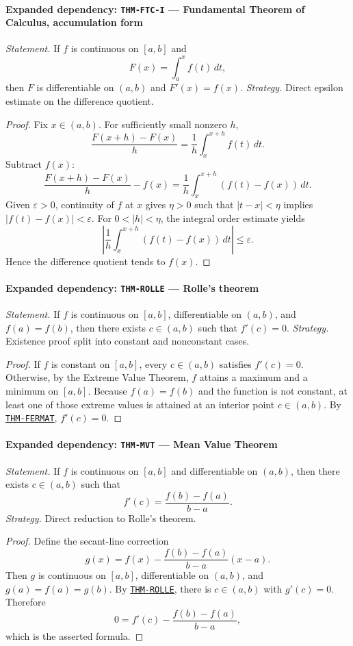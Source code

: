 \documentclass[10pt]{article}
\newcommand{\pidraw}[1]{\begingroup\urlstyle{tt}\nolinkurl{#1}\endgroup}
\newcommand{\pidref}[1]{\hyperref[prf:#1]{\pidraw{#1}}}
\newcommand{\pid}[1]{\pidref{#1}}
\theoremstyle{definition}
\theoremstyle{remark}
\begin{document}
\paragraph{Expanded dependency: \pidraw{THM-FTC-I} --- Fundamental Theorem of Calculus, accumulation form}
\textit{Statement.} If $f$ is continuous on $[a,b]$ and
\[
F(x)=\int_a^x f(t)\,dt,
\]
then $F$ is differentiable on $(a,b)$ and $F'(x)=f(x)$.
\textit{Strategy.} Direct epsilon estimate on the difference quotient.
\begin{proof}Fix $x\in(a,b)$. For sufficiently small nonzero $h$,
\[
\frac{F(x+h)-F(x)}{h}
=
\frac1h\int_x^{x+h}f(t)\,dt.
\]
Subtract $f(x)$:
\[
\frac{F(x+h)-F(x)}{h}-f(x)
=
\frac1h\int_x^{x+h}(f(t)-f(x))\,dt.
\]
Given $\varepsilon>0$, continuity of $f$ at $x$ gives $\eta>0$ such that
$|t-x|<\eta$ implies $|f(t)-f(x)|<\varepsilon$. For $0<|h|<\eta$, the
integral order estimate yields
\[
\left|
\frac1h\int_x^{x+h}(f(t)-f(x))\,dt
\right|
\le \varepsilon.
\]
Hence the difference quotient tends to $f(x)$.\end{proof}

\paragraph{Expanded dependency: \pidraw{THM-ROLLE} --- Rolle's theorem}
\textit{Statement.} If $f$ is continuous on $[a,b]$, differentiable on $(a,b)$, and $f(a)=f(b)$, then there exists $c\in(a,b)$ such that $f'(c)=0$.
\textit{Strategy.} Existence proof split into constant and nonconstant cases.
\begin{proof}If $f$ is constant on $[a,b]$, every $c\in(a,b)$ satisfies $f'(c)=0$.
Otherwise, by the Extreme Value Theorem, $f$ attains a maximum and a minimum
on $[a,b]$. Because $f(a)=f(b)$ and the function is not constant, at least one
of those extreme values is attained at an interior point $c\in(a,b)$.
By \pid{THM-FERMAT}, $f'(c)=0$.\end{proof}

\paragraph{Expanded dependency: \pidraw{THM-MVT} --- Mean Value Theorem}
\textit{Statement.} If $f$ is continuous on $[a,b]$ and differentiable on $(a,b)$, then there exists $c\in(a,b)$ such that
\[
f'(c)=\frac{f(b)-f(a)}{b-a}.
\]
\textit{Strategy.} Direct reduction to Rolle's theorem.
\begin{proof}Define the secant-line correction
\[
g(x)=f(x)-\frac{f(b)-f(a)}{b-a}(x-a).
\]
Then $g$ is continuous on $[a,b]$, differentiable on $(a,b)$, and
$g(a)=f(a)=g(b)$. By \pid{THM-ROLLE}, there is $c\in(a,b)$ with $g'(c)=0$.
Therefore
\[
0=f'(c)-\frac{f(b)-f(a)}{b-a},
\]
which is the asserted formula.\end{proof}
\end{document}
